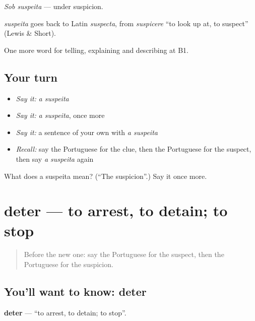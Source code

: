 \emph{Sob suspeita} — under suspicion.

\begin{cousinweb}
\emph{suspeita} goes back to Latin \emph{suspecta}, from \emph{suspicere} \textquotedblleft{}to look up at, to suspect\textquotedblright{} (Lewis \& Short).
\end{cousinweb}

\begin{grammarlens}[title={What you've built}]
One more word for telling, explaining and describing at B1.
\end{grammarlens}

\subsection*{Your turn}
\begin{itemize}
\raggedright
  \item \emph{Say it:} \emph{a suspeita}
  \item \emph{Say it:} \emph{a suspeita}, once more
  \item \emph{Say it:} a sentence of your own with \emph{a suspeita}
  \item \emph{Recall:} say the Portuguese for the clue, then the Portuguese for the suspect, then say \emph{a suspeita} again
\end{itemize}

\begin{tcolorbox}[breakable,colback=teal!4,colframe=teal!35!black,title={Before you move on}]
What does a suspeita mean? (\textquotedblleft{}The suspicion\textquotedblright{}.) Say it once more.
\end{tcolorbox}
\section[deter]{deter — to arrest, to detain; to stop}

\label{lesson:PT-C295-deter}



\begin{quote}
Before the new one: say the Portuguese for the suspect, then the Portuguese for the suspicion.
\end{quote}

\subsection*{You'll want to know: deter}
\textbf{deter} — \textquotedblleft{}to arrest, to detain; to stop\textquotedblright{}.

